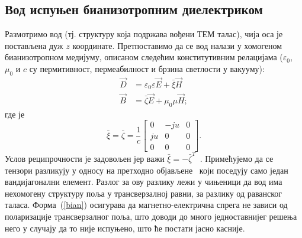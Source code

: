 \subsection{Вод испуњен бианизотропним диелектриком}
Размотримо вод (тј. структуру која подржава вођени ТЕМ талас), чија оса је постављена дуж $z$ координате. Претпоставимо да се вод налази у хомогеном бианизотропном медијуму, описаном следећим конститутивним релацијама ($\varepsilon_0$, $\mu_0$ и $c$ су пермитивност, пермеабилност и брзина светлости у вакууму):
\begin{equation}\label{const}
\begin{split}
\vec{D} & = \varepsilon_0\varepsilon \vec{E} + \bar{\xi}\vec{H}\\
\vec{B} & = \bar{\zeta} \vec{E} + \mu_0\mu \vec{H};
\end{split}
\end{equation}
где је
\begin{equation}\label{bian}
\bar{\xi} = \bar{\zeta} = \frac{1}{c}
\begin{bmatrix}
0 & -ju & 0 \\
ju & 0 & 0 \\
0 & 0 & 0
\end{bmatrix}.
\end{equation}
Услов реципрочности је задовољен јер важи $\bar{\xi}=-\bar{\zeta}^T$~\cite{shivola}. Примећујемо да се тензори разликују у односу на претходно објављене~\cite{marques, chen:05, kriegler, shalaev} који поседују само један вандијагонални елемент. Разлог за ову разлику лежи у чињеници да вод има нехомогену структуру поља у трансверзалној равни, за разлику од раванског таласа. Форма~(\ref{bian}) осигурава да магнетно-електрична спрега не зависи од поларизације трансверзалног поља, што доводи до много једноставнијег решења него у случају да то није испуњено, што ће постати јасно касније.


